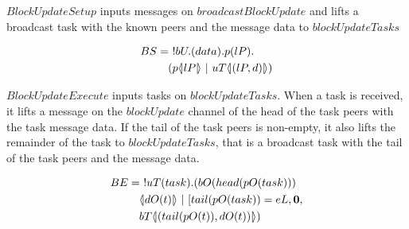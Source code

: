 $BlockUpdateSetup$ inputs messages on $broadcastBlockUpdate$ and lifts a broadcast task with the known peers and the message data to $blockUpdateTasks$

\begin{align*}
    BS &=\ !bU.(data).p(lP).\\
    &\quad (p \langle \! | lP | \! \rangle\ |\ uT \langle \! | (lP,d) | \! \rangle)
\end{align*}

$BlockUpdateExecute$ inputs tasks on $blockUpdateTasks$. When a task is received, it lifts a message on the $blockUpdate$ channel of the head of the task peers with the task message data. If the tail of the task peers is non-empty, it also lifts the remainder of the task to $blockUpdateTasks$, that is a broadcast task with the tail of the task peers and the message data.

\begin{align*}
    BE &=\ !uT(task).(bO(head(pO(task)))\\
    &\quad  \langle \! | dO(t) | \! \rangle\ |\ [tail(pO(task))=eL,\mathbf{0},\\
    &\quad bT \langle \! | (tail(pO(t)),dO(t)) | \! \rangle)
\end{align*}

